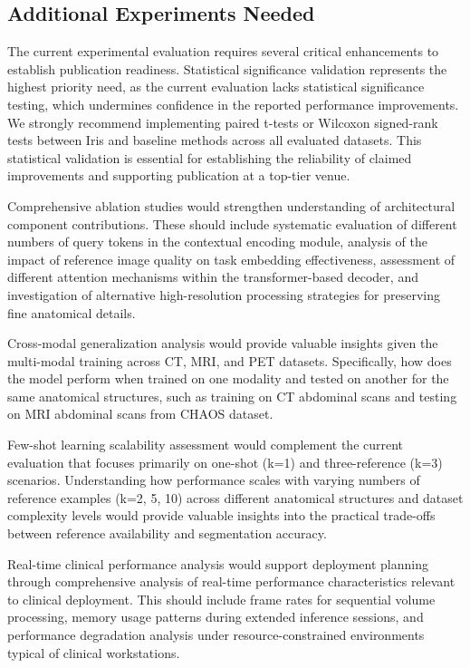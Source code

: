 \subsection*{Additional Experiments Needed}
The current experimental evaluation requires several critical enhancements to establish publication readiness. Statistical significance validation represents the highest priority need, as the current evaluation lacks statistical significance testing, which undermines confidence in the reported performance improvements. We strongly recommend implementing paired t-tests or Wilcoxon signed-rank tests between Iris and baseline methods across all evaluated datasets. This statistical validation is essential for establishing the reliability of claimed improvements and supporting publication at a top-tier venue.

Comprehensive ablation studies would strengthen understanding of architectural component contributions. These should include systematic evaluation of different numbers of query tokens in the contextual encoding module, analysis of the impact of reference image quality on task embedding effectiveness, assessment of different attention mechanisms within the transformer-based decoder, and investigation of alternative high-resolution processing strategies for preserving fine anatomical details.

Cross-modal generalization analysis would provide valuable insights given the multi-modal training across CT, MRI, and PET datasets. Specifically, how does the model perform when trained on one modality and tested on another for the same anatomical structures, such as training on CT abdominal scans and testing on MRI abdominal scans from CHAOS dataset.

Few-shot learning scalability assessment would complement the current evaluation that focuses primarily on one-shot (k=1) and three-reference (k=3) scenarios. Understanding how performance scales with varying numbers of reference examples (k=2, 5, 10) across different anatomical structures and dataset complexity levels would provide valuable insights into the practical trade-offs between reference availability and segmentation accuracy.

Real-time clinical performance analysis would support deployment planning through comprehensive analysis of real-time performance characteristics relevant to clinical deployment. This should include frame rates for sequential volume processing, memory usage patterns during extended inference sessions, and performance degradation analysis under resource-constrained environments typical of clinical workstations.


